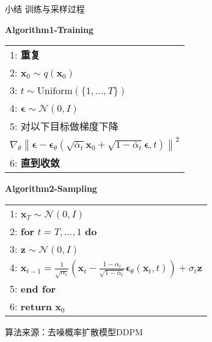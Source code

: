 \begin{refsection}
\begin{frame}{小结}
  \centering
  {\color{purple} \small 训练与采样过程}
  \vspace{1em}

  \begin{minipage}{0.45\linewidth}
    \scriptsize
    \textbf{Algorithm1-Training}
    \vspace{0.5em}
    \renewcommand{\arraystretch}{1.5}
    \begin{tabular}{l}
      \toprule
      1: \quad \textbf{重复} \\
      2: \quad \hspace{1em} $\mathbf{x}_0 \sim q(\mathbf{x}_0)$ \\
      3: \quad \hspace{1em} $t \sim \mathrm{Uniform}(\{1, \ldots, T\})$ \\
      4: \quad \hspace{1em} $\boldsymbol{\epsilon} \sim \mathcal{N}(0, I)$ \\
      5: \quad \hspace{1em} 对以下目标做梯度下降 \\
      \quad \hspace{2.5em} $\nabla_\theta \left\| \boldsymbol{\epsilon} - \boldsymbol{\epsilon}_\theta\left(\sqrt{\bar{\alpha}_t} \mathbf{x}_0 + \sqrt{1 - \bar{\alpha}_t} \boldsymbol{\epsilon}, t\right) \right\|^2$ \\
      6: \quad \textbf{直到收敛} \\
      \bottomrule
    \end{tabular}
  \end{minipage}
  \hfill
  \renewcommand{\arraystretch}{1.5}
  \begin{minipage}{0.45\linewidth}
    \scriptsize
    \textbf{Algorithm2-Sampling}
    \vspace{0.5em}
    \begin{tabular}{l}
      \toprule
      1: \quad $\mathbf{x}_T \sim \mathcal{N}(0, I)$ \\
      2: \quad \textbf{for} $t = T, \ldots, 1$ \textbf{do} \\
      3: \quad \hspace{1em} $\mathbf{z} \sim \mathcal{N}(0, I)$ \\
      4: \quad \hspace{1em} $\mathbf{x}_{t-1} = \frac{1}{\sqrt{\alpha_t}} \left( \mathbf{x}_t - \frac{1 - \alpha_t}{\sqrt{1 - \bar{\alpha}_t}} \boldsymbol{\epsilon}_\theta(\mathbf{x}_t, t) \right) + \sigma_t \mathbf{z}$ \\
      5: \quad \textbf{end for} \\
      6: \quad \textbf{return} $\mathbf{x}_0$ \\
      \bottomrule
    \end{tabular}
  \end{minipage}
  \renewcommand{\arraystretch}{1}
  \vspace{1em}

  算法来源：去噪概率扩散模型DDPM~\parencite{ho2020denoising}
  \bottomleftrefs
\end{frame}
\end{refsection}



